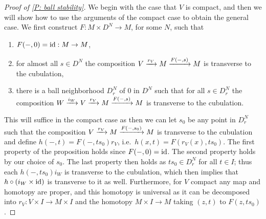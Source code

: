 \begin{proof}[Proof of \cref{P: ball stability}]
We begin with the case that $V$ is compact, and then we will show how to use the arguments of the compact case to obtain the general case.  We first construct $F:M\times D^N\to M$, for some $N$, such that 

\begin{enumerate}

\item $F(-,0)=\mathrm{id}:M\to M$,
\item for almost all $s\in D^N$ the composition $V\xrightarrow{r_V} M\xrightarrow{F(-,s)}M$ is transverse to the cubulation,

\item  there is a ball neighborhood $D_r^N$ of $0$ in $D^N$ such that for all $s\in D_r^N$ the composition $W\xrightarrow{i_{W}} V\xrightarrow{r_V} M\xrightarrow{F(-,s)}M$ is transverse to the cubulation. 
\end{enumerate}



This will suffice in the compact case as then we can let $s_0$ be any point in $D_r^N$ such that the composition $V\xrightarrow{r_V} M\xrightarrow{F(-,s_0)}M$ is transverse to the cubulation and define $h(-,t)=F(-,ts_0)r_V$, i.e.\ $h(x,t)=F(r_V(x),ts_0)$.  The first property of the proposition holds since $F(-,0)=\mathrm{id}$. The second property holds by our choice of $s_0$.  The last property then holds as $ts_0\in D_r^N$ for all $t\in I$; thus each $h(-,ts_0)i_W$ is transverse to the cubulation, which then implies that  $h\circ(i_{W}\times \mathrm{id})$ is transverse to it as well. Furthermore, for $V$ compact any map and homotopy are proper, and this homotopy is universal as it can be decomposed into $r_V:V\times I\to M\times I$ and the homotopy $M\times I\to M$ taking $(z,t)$ to $F(z,ts_0)$. 




\end{proof}
